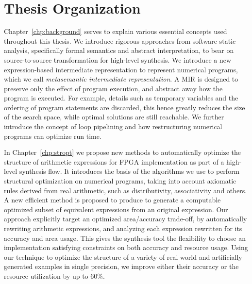 \section{Thesis Organization}

Chapter~\ref{chp:background} serves to explain various essential concepts used
throughout this thesis.  We introduce rigorous approaches from software static
analysis, specifically formal semantics and abstract interpretation, to bear
on source-to-source transformation for high-level synthesis.  We introduce
a new expression-based intermediate representation to represent numerical
programs, which we call \emph{metasemantic intermediate representation}.  A
MIR is designed to preserve only the effect of program execution, and abstract
away how the program is executed.  For example, details such as temporary
variables and the ordering of program statements are discarded, this hence
greatly reduces the size of the search space, while optimal solutions are
still reachable.  We further introduce the concept of loop pipelining and how
restructuring numerical programs can optimize run time.

In Chapter~\ref{chp:stropt} we propose new methods to automatically optimize
the structure of arithmetic expressions for FPGA implementation as part of
a high-level synthesis flow.  It introduces the basis of the algorithms we
use to perform structural optimization on numerical programs, taking into
account axiomatic rules derived from real arithmetic, such as distributivity,
associativity and others.  A new efficient method is proposed to produce to
generate a computable optimized subset of equivalent expressions from an
original expression.  Our approach explicitly target an optimized area/accuracy
trade-off, by automatically rewriting arithmetic expressions, and analyzing
each expression rewritten for its accuracy and area usage.  This gives
the synthesis tool the flexibility to choose an implementation satisfying
constraints on both accuracy and resource usage.  Using our technique to
optimize the structure of a variety of real world and artificially generated
examples in single precision, we improve either their accuracy or the resource
utilization by up to 60\%.

